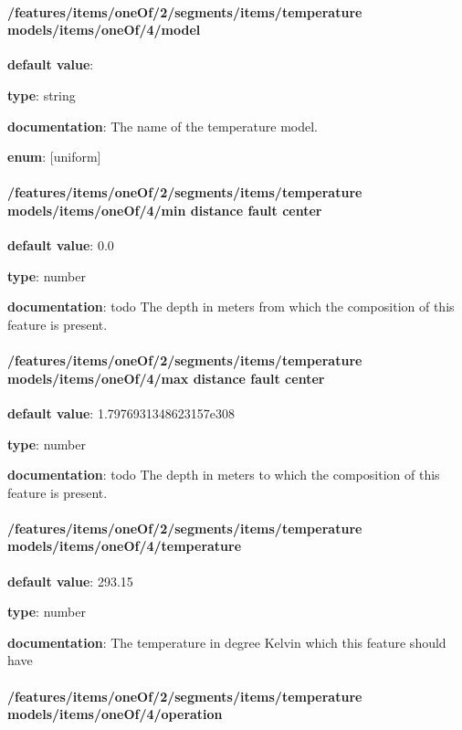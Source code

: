 \paragraph{/features/items/oneOf/2/segments/items/temperature models/items/oneOf/4/model} \begin{itemized}
\item {\bf default value}: 
\item {\bf type}: string
\item {\bf documentation}: The name of the temperature model.
\item {\bf enum}: [uniform]\end{itemized}\paragraph{/features/items/oneOf/2/segments/items/temperature models/items/oneOf/4/min distance fault center} \begin{itemized}
\item {\bf default value}: 0.0
\item {\bf type}: number
\item {\bf documentation}: todo The depth in meters from which the composition of this feature is present.
\end{itemized}\paragraph{/features/items/oneOf/2/segments/items/temperature models/items/oneOf/4/max distance fault center} \begin{itemized}
\item {\bf default value}: 1.7976931348623157e308
\item {\bf type}: number
\item {\bf documentation}: todo The depth in meters to which the composition of this feature is present.
\end{itemized}\paragraph{/features/items/oneOf/2/segments/items/temperature models/items/oneOf/4/temperature} \begin{itemized}
\item {\bf default value}: 293.15
\item {\bf type}: number
\item {\bf documentation}: The temperature in degree Kelvin which this feature should have
\end{itemized}\paragraph{/features/items/oneOf/2/segments/items/temperature models/items/oneOf/4/operation} \begin{itemized}

\end{itemized}
